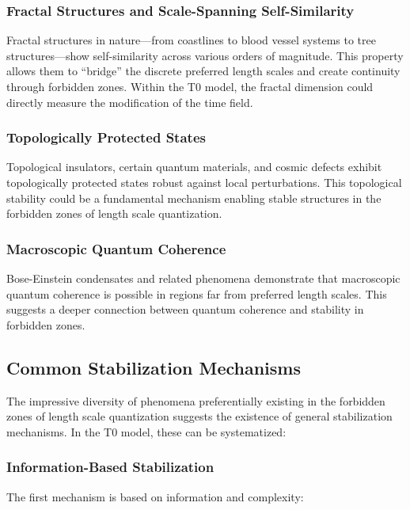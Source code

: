 \documentclass[12pt,a4paper]{article}
\begin{document}
	\subsubsection{Fractal Structures and Scale-Spanning Self-Similarity}
	
	Fractal structures in nature—from coastlines to blood vessel systems to tree structures—show self-similarity across various orders of magnitude. This property allows them to ``bridge'' the discrete preferred length scales and create continuity through forbidden zones. Within the T0 model, the fractal dimension could directly measure the modification of the time field.
	
	\subsubsection{Topologically Protected States}
	
	Topological insulators, certain quantum materials, and cosmic defects exhibit topologically protected states robust against local perturbations. This topological stability could be a fundamental mechanism enabling stable structures in the forbidden zones of length scale quantization.
	
	\subsubsection{Macroscopic Quantum Coherence}
	
	Bose-Einstein condensates and related phenomena demonstrate that macroscopic quantum coherence is possible in regions far from preferred length scales. This suggests a deeper connection between quantum coherence and stability in forbidden zones.
	
	\subsection{Common Stabilization Mechanisms}
	
	The impressive diversity of phenomena preferentially existing in the forbidden zones of length scale quantization suggests the existence of general stabilization mechanisms. In the T0 model, these can be systematized:
	
	\subsubsection{Information-Based Stabilization}
	
	The first mechanism is based on information and complexity:
	
\end{document}
